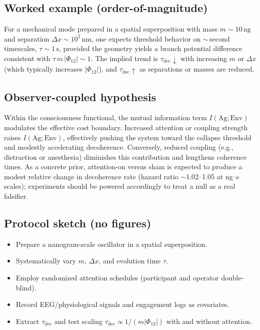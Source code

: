 \documentclass[reprint,aps,prd,nofootinbib]{revtex4-2}
\begin{document}
\subsection{Worked example (order-of-magnitude)}
For a mechanical mode prepared in a spatial superposition with mass $m\sim 10\,\mathrm{ng}$ and separation $\Delta x\sim 10^2\,\mathrm{nm}$, one expects threshold behavior on $\sim$\,second timescales, $\tau\sim 1\,\mathrm{s}$, provided the geometry yields a branch potential difference consistent with $\tau\,m\,|\Phi_{12}|\sim 1$. The implied trend is $\tau_{\mathrm{dec}}\downarrow$ with increasing $m$ or $\Delta x$ (which typically increases $|\Phi_{12}|$), and $\tau_{\mathrm{dec}}\uparrow$ as separations or masses are reduced.

\subsection{Observer-coupled hypothesis}
Within the consciousness functional, the mutual information term $I(\mathrm{Ag};\mathrm{Env})$ modulates the effective cost boundary. Increased attention or coupling strength raises $I(\mathrm{Ag};\mathrm{Env})$, effectively pushing the system toward the collapse threshold and modestly accelerating decoherence. Conversely, reduced coupling (e.g., distraction or anesthesia) diminishes this contribution and lengthens coherence times. As a concrete prior, attention-on versus sham is expected to produce a modest relative change in decoherence rate (hazard ratio $\sim$1.02--1.05 at ng--s scales); experiments should be powered accordingly to treat a null as a real falsifier.

\subsection{Protocol sketch (no figures)}
\begin{itemize}
  \item Prepare a nanogram-scale oscillator in a spatial superposition.
  \item Systematically vary $m$, $\Delta x$, and evolution time $\tau$.
  \item Employ randomized attention schedules (participant and operator double-blind).
  \item Record EEG/physiological signals and engagement logs as covariates.
  \item Extract $\tau_{\mathrm{dec}}$ and test scaling $\tau_{\mathrm{dec}}\propto 1/(m|\Phi_{12}|)$ with and without attention.
\end{itemize}
\end{document}
